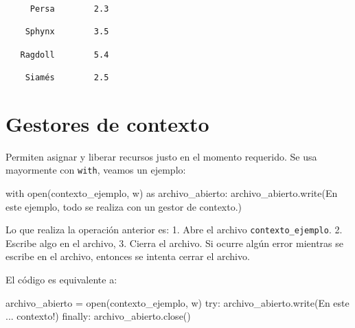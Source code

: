 \documentclass[
  letterpaper,
  DIV=11,
  numbers=noendperiod]{scrreprt}
\newenvironment{Shaded}{\begin{snugshade}}{\end{snugshade}}
\newcommand{\BuiltInTok}[1]{\textcolor[rgb]{0.00,0.23,0.31}{#1}}
\newcommand{\ControlFlowTok}[1]{\textcolor[rgb]{0.00,0.23,0.31}{#1}}
\newcommand{\ImportTok}[1]{\textcolor[rgb]{0.00,0.46,0.62}{#1}}
\newcommand{\NormalTok}[1]{\textcolor[rgb]{0.00,0.23,0.31}{#1}}
\newcommand{\OperatorTok}[1]{\textcolor[rgb]{0.37,0.37,0.37}{#1}}
\newcommand{\StringTok}[1]{\textcolor[rgb]{0.13,0.47,0.30}{#1}}
\begin{document}
\begin{verbatim}
     Persa        2.3 

    Sphynx        3.5 

   Ragdoll        5.4 

    Siamés        2.5 
\end{verbatim}


\chapter{Gestores de contexto}\label{gestores-de-contexto}

Permiten asignar y liberar recursos justo en el momento requerido. Se
usa mayormente con \texttt{with}, veamos un ejemplo:

\begin{Shaded}
\begin{Highlighting}[]
\ControlFlowTok{with} \BuiltInTok{open}\NormalTok{(}\StringTok{\textquotesingle{}contexto\_ejemplo\textquotesingle{}}\NormalTok{, }\StringTok{\textquotesingle{}w\textquotesingle{}}\NormalTok{) }\ImportTok{as}\NormalTok{ archivo\_abierto:}
\NormalTok{    archivo\_abierto.write(}\StringTok{\textquotesingle{}En este ejemplo, todo se realiza con un gestor de contexto.\textquotesingle{}}\NormalTok{)}
\end{Highlighting}
\end{Shaded}

Lo que realiza la operación anterior es: 1. Abre el archivo
\texttt{contexto\_ejemplo}. 2. Escribe algo en el archivo, 3. Cierra el
archivo. Si ocurre algún error mientras se escribe en el archivo,
entonces se intenta cerrar el archivo.

El código es equivalente a:

\begin{Shaded}
\begin{Highlighting}[]
\NormalTok{archivo\_abierto }\OperatorTok{=} \BuiltInTok{open}\NormalTok{(}\StringTok{\textquotesingle{}contexto\_ejemplo\textquotesingle{}}\NormalTok{, }\StringTok{\textquotesingle{}w\textquotesingle{}}\NormalTok{)}
\ControlFlowTok{try}\NormalTok{:}
\NormalTok{    archivo\_abierto.write(}\StringTok{\textquotesingle{}En este ... contexto!\textquotesingle{}}\NormalTok{)}
\ControlFlowTok{finally}\NormalTok{:}
\NormalTok{    archivo\_abierto.close()}
\end{Highlighting}
\end{Shaded}
\end{document}
